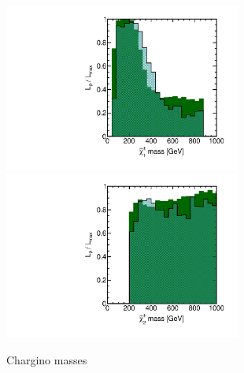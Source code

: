 \begin{figure}[htbp]
\begin{center}
\includegraphics[height=5.5cm]{figs/fig_chi_1_pm.pdf} 
\includegraphics[height=5.5cm]{figs/fig_chi_2_pm.pdf}
\caption{Chargino masses}
\label{default}
\end{center}
\end{figure}


